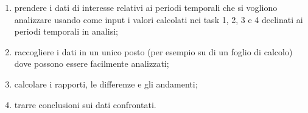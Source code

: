 \begin{enumerate}[resume]
    \begin{enumerate}[label=\alph*.]
        \item prendere i dati di interesse relativi ai periodi temporali che si vogliono analizzare usando come input i valori calcolati nei task 1, 2, 3 e 4 declinati ai periodi temporali in analisi;
        \item raccogliere i dati in un unico posto (per esempio su di un foglio di calcolo) dove possono essere facilmente analizzati;
        \item calcolare i rapporti, le differenze e gli andamenti;
        \item trarre conclusioni sui dati confrontati.
    \end{enumerate}
\end{enumerate}